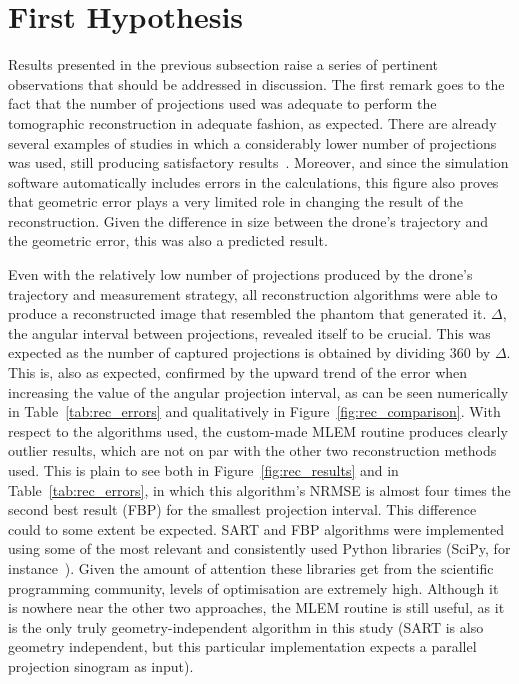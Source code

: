 \section{First Hypothesis}%
\label{sec:first_hypothesis}


Results presented in the previous subsection raise a series of pertinent
observations that should be addressed in discussion. The first remark
goes to the fact that the number of projections used was adequate to
perform the tomographic reconstruction in adequate fashion, as expected.
There are already several examples of studies in which a considerably
lower number of projections was used, still producing satisfactory
results~\cite{Pundt2005}. Moreover, and since the simulation software
automatically includes errors in the calculations, this figure also
proves that geometric error plays a very limited role in changing the
result of the reconstruction. Given the difference in size between the
drone's trajectory and the geometric error, this was also a predicted
result.

Even with the relatively low number of projections produced by the
drone's trajectory and measurement strategy, all reconstruction
algorithms were able to produce a reconstructed image that resembled the
phantom that generated it. $\Delta$, the angular interval between
projections, revealed itself to be crucial. This was expected as the
number of captured projections is obtained by dividing 360 by $\Delta$.
This is, also as expected, confirmed by the upward trend of the error
when increasing the value of the angular projection interval, as can be
seen numerically in Table~\ref{tab:rec_errors} and qualitatively in
Figure~\ref{fig:rec_comparison}. With respect to the algorithms used,
the custom-made MLEM routine produces clearly outlier results, which are
not on par with the other two reconstruction methods used. This is plain
to see both in Figure~\ref{fig:rec_results} and in
Table~\ref{tab:rec_errors}, in which this algorithm's NRMSE is almost
four times the second best result (FBP) for the smallest projection
interval. This difference could to some extent be expected. SART and FBP
algorithms were implemented using some of the most relevant and
consistently used Python libraries (SciPy, for
instance~\cite{Oliphant2007}). Given the amount of attention these
libraries get from the scientific programming community, levels of
optimisation are extremely high. Although it is nowhere near the other
two approaches, the MLEM routine is still useful, as it is the only
truly geometry-independent algorithm in this study (SART is also
geometry independent, but this particular implementation expects a
parallel projection sinogram as input).

